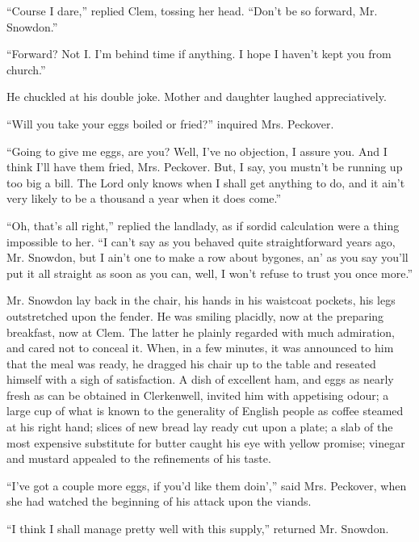 ``Course I dare,'' replied Clem, tossing her head. ``Don't be so
forward, Mr. Snowdon.''

``Forward? Not I. I'm behind time if anything. I hope I haven't kept you
from church.''

He chuckled at his double joke. Mother and daughter laughed
appreciatively.

``Will you take your eggs boiled or fried?'' inquired Mrs. Peckover.

``Going to give me eggs, are you? Well, I've no objection, I assure you.
And I think I'll have them fried, Mrs. Peckover. But, I say, you mustn't
be running up too big a bill. The Lord only knows when I shall get
anything to do, and it ain't very likely to be a thousand a year when it
does come.''

``Oh, that's all right,'' replied the landlady, as if sordid calculation
were a thing impossible to her. ``I can't say as you behaved quite
straightforward years ago, Mr. Snowdon, but I ain't one to make a row
about bygones, {}an' as you say you'll put it all straight as soon as
you can, well, I won't refuse to trust you once more.''

Mr. Snowdon lay back in the chair, his hands in his waistcoat pockets,
his legs outstretched upon the fender. He was smiling placidly, now at
the preparing breakfast, now at Clem. The latter he plainly regarded
with much admiration, and cared not to conceal it. When, in a few
minutes, it was announced to him that the meal was ready, he dragged his
chair up to the table and reseated himself with a sigh of satisfaction.
A dish of excellent ham, and eggs as nearly fresh as can be obtained in
Clerkenwell, invited him with appetising odour; a large cup of what is
known to the generality of English people as coffee steamed at his right
hand; slices of new bread lay ready cut upon a plate; a slab of the most
expensive substitute for butter caught his eye with yellow promise;
vinegar and mustard appealed to the refinements of his taste.

``I've got a couple more eggs, if you'd like {}them doin','' said Mrs.
Peckover, when she had watched the beginning of his attack upon the
viands.

``I think I shall manage pretty well with this supply,'' returned Mr.
Snowdon.

